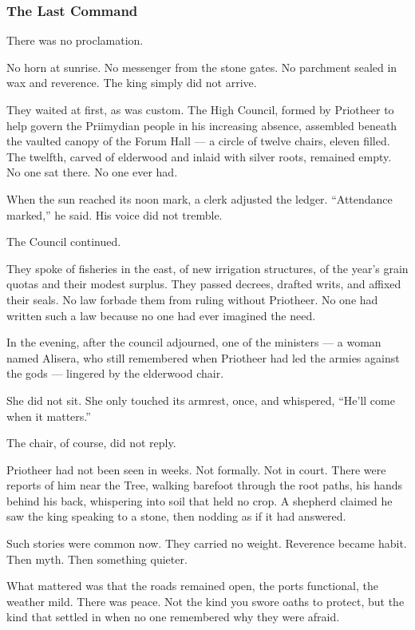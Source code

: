 \documentclass[12pt]{article}
\begin{document}
\subsubsection*{The Last Command}

There was no proclamation.

No horn at sunrise. No messenger from the stone gates. No parchment sealed in wax and reverence. The king simply did not arrive.

They waited at first, as was custom. The High Council, formed by Priotheer to help govern the Priimydian people in his increasing absence, assembled beneath the vaulted canopy of the Forum Hall — a circle of twelve chairs, eleven filled. The twelfth, carved of elderwood and inlaid with silver roots, remained empty. No one sat there. No one ever had.

When the sun reached its noon mark, a clerk adjusted the ledger. “Attendance marked,” he said. His voice did not tremble.

The Council continued.

They spoke of fisheries in the east, of new irrigation structures, of the year’s grain quotas and their modest surplus. They passed decrees, drafted writs, and affixed their seals. No law forbade them from ruling without Priotheer. No one had written such a law because no one had ever imagined the need.

In the evening, after the council adjourned, one of the ministers — a woman named Alisera, who still remembered when Priotheer had led the armies against the gods — lingered by the elderwood chair.

She did not sit. She only touched its armrest, once, and whispered, “He’ll come when it matters.”

The chair, of course, did not reply.

Priotheer had not been seen in weeks. Not formally. Not in court. There were reports of him near the Tree, walking barefoot through the root paths, his hands behind his back, whispering into soil that held no crop. A shepherd claimed he saw the king speaking to a stone, then nodding as if it had answered.

Such stories were common now. They carried no weight. Reverence became habit. Then myth. Then something quieter.

What mattered was that the roads remained open, the ports functional, the weather mild. There was peace. Not the kind you swore oaths to protect, but the kind that settled in when no one remembered why they were afraid.
\end{document}
